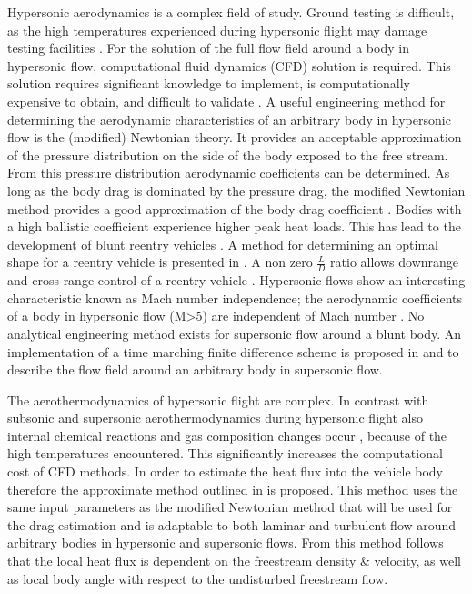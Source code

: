 Hypersonic aerodynamics is a complex field of study. Ground testing is difficult, as the high temperatures experienced during hypersonic flight may damage testing facilities \cite{Anderson2002} \cite{Bertin1994}. For the solution of the full flow field around a body in hypersonic flow, computational fluid dynamics (CFD) solution is required. This solution requires significant knowledge to implement, is computationally expensive to obtain, and difficult to validate \cite{Anderson2002} \cite{Bertin1994}. A useful engineering method for determining the aerodynamic characteristics of an arbitrary body in hypersonic flow is the (modified) Newtonian theory. It provides an acceptable approximation of the pressure distribution on the side of the body exposed to the free stream. From this pressure distribution aerodynamic coefficients can be determined. As long as the body drag is dominated by the pressure drag, the modified Newtonian method provides a good approximation of the body drag coefficient \cite{Anderson2002} \cite{Bertin1994} \cite{Bertin2006}. Bodies with a high ballistic coefficient experience higher peak heat loads. This has lead to the development of blunt reentry vehicles\cite{Bertin1994} \cite{Theisinger2009}. A method for determining an optimal shape for a reentry vehicle is presented in \cite{Theisinger2009}. A non zero $\frac{L}{D}$ ratio allows downrange and cross range control of a reentry vehicle \cite{Theisinger2009}. Hypersonic flows show an interesting characteristic known as Mach number independence; the aerodynamic coefficients of a body in hypersonic flow (M>5) are independent of Mach number \cite{Bertin1994,AndersonJr.2007,Hollis}. No analytical engineering method exists for supersonic flow around a blunt body. An implementation of a time marching finite difference scheme is proposed in \cite{AndersonJr.2007} and \cite{AndersonJr.2006} to describe the flow field around an arbitrary body in supersonic flow. 

The aerothermodynamics of hypersonic flight are complex. In contrast with subsonic and supersonic aerothermodynamics during hypersonic flight also internal chemical reactions and gas composition changes occur \cite{AndersonJr.2006}, because of the high temperatures encountered. This significantly increases the computational cost of CFD methods. In order to estimate the heat flux into the vehicle body therefore the approximate method outlined in \cite{Tauber1986} \cite{AndersonJr.2006} is proposed. This method uses the same input parameters as the modified Newtonian method that will be used for the drag estimation and is adaptable to both laminar and turbulent flow around arbitrary bodies in hypersonic and supersonic flows. From this method follows that the local heat flux is dependent on the freestream density \& velocity, as well as local body angle with respect to the undisturbed freestream flow.
